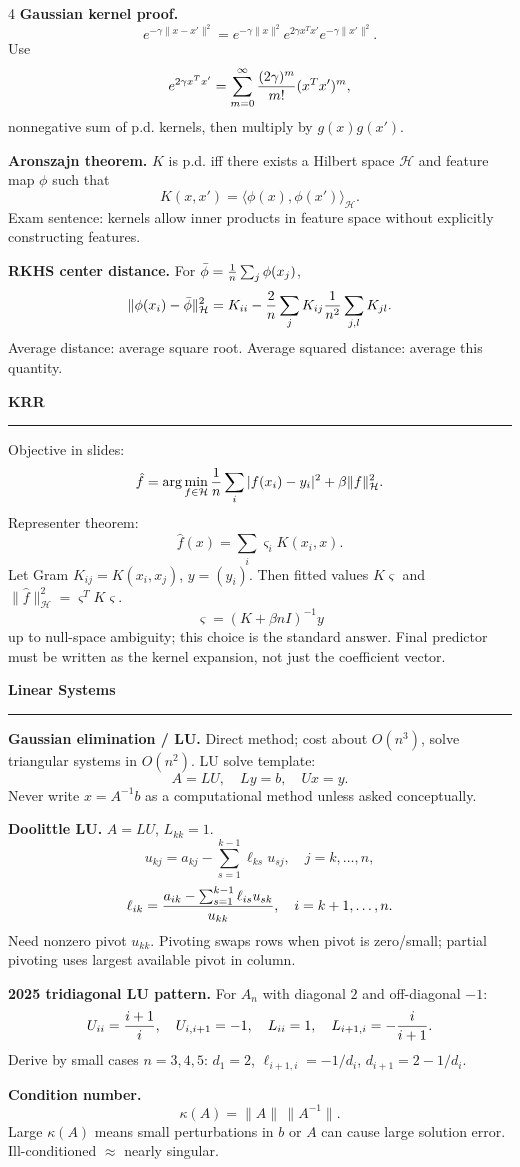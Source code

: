 \documentclass[10pt,a4paper,landscape]{article}
\newcommand{\topic}[1]{\vspace{2pt}\textbf{\large #1}\par\hrule\vspace{2pt}}
\newcommand{\subtopic}[1]{\textbf{#1.}}
\newcommand{\Hcal}{\mathcal H}
\begin{document}
\begin{multicols*}{4}
\subtopic{Gaussian kernel proof}
\[
e^{-\gamma\|x-x'\|^2}
=e^{-\gamma\|x\|^2}e^{2\gamma x^Tx'}e^{-\gamma\|x'\|^2}.
\]
Use
\[
e^{2\gamma x^Tx'}=\sum_{m=0}^{\infty}{(2\gamma)^m\over m!}(x^Tx')^m,
\]
nonnegative sum of p.d. kernels, then multiply by $g(x)g(x')$.

\subtopic{Aronszajn theorem}
$K$ is p.d. iff there exists a Hilbert space $\Hcal$ and feature map $\phi$ such that
\[
K(x,x')=\langle \phi(x),\phi(x')\rangle_{\Hcal}.
\]
Exam sentence: kernels allow inner products in feature space without explicitly constructing features.

\subtopic{RKHS center distance}
For $\bar\phi={1\over n}\sum_j\phi(x_j)$,
\[
\|\phi(x_i)-\bar\phi\|_{\Hcal}^2
=K_{ii}-{2\over n}\sum_jK_{ij}
{1\over n^2}\sum_{j,l}K_{jl}.
\]
Average distance: average square root. Average squared distance: average this quantity.

\topic{KRR}
Objective in slides:
\[
\hat f=\arg\min_{f\in\Hcal}{1\over n}\sum_i |f(x_i)-y_i|^2+\beta\|f\|_{\Hcal}^2.
\]
Representer theorem:
\[
\hat f(x)=\sum_i \varsigma_iK(x_i,x).
\]
Let Gram $K_{ij}=K(x_i,x_j)$, $y=(y_i)$. Then fitted values $K\varsigma$ and $\|\hat f\|_{\Hcal}^2=\varsigma^TK\varsigma$.
\[
\varsigma=(K+\beta n I)^{-1}y
\]
up to null-space ambiguity; this choice is the standard answer. Final predictor must be written as the kernel expansion, not just the coefficient vector.

\topic{Linear Systems}
\subtopic{Gaussian elimination / LU}
Direct method; cost about $O(n^3)$, solve triangular systems in $O(n^2)$.
LU solve template:
\[
A=LU,\quad Ly=b,\quad Ux=y.
\]
Never write $x=A^{-1}b$ as a computational method unless asked conceptually.

\subtopic{Doolittle LU}
$A=LU$, $L_{kk}=1$.
\[
u_{kj}=a_{kj}-\sum_{s=1}^{k-1}\ell_{ks}u_{sj},\quad j=k,\ldots,n,
\]
\[
\ell_{ik}={a_{ik}-\sum_{s=1}^{k-1}\ell_{is}u_{sk}\over u_{kk}},\quad i=k+1,\ldots,n.
\]
Need nonzero pivot $u_{kk}$. Pivoting swaps rows when pivot is zero/small; partial pivoting uses largest available pivot in column.

\subtopic{2025 tridiagonal LU pattern}
For $A_n$ with diagonal $2$ and off-diagonal $-1$:
\[
U_{ii}={i+1\over i},\quad U_{i,i+1}=-1,\quad
L_{ii}=1,\quad L_{i+1,i}=-{i\over i+1}.
\]
Derive by small cases $n=3,4,5$:
$d_1=2$, $\ell_{i+1,i}=-1/d_i$, $d_{i+1}=2-1/d_i$.

\subtopic{Condition number}
\[
\kappa(A)=\|A\|\,\|A^{-1}\|.
\]
Large $\kappa(A)$ means small perturbations in $b$ or $A$ can cause large solution error. Ill-conditioned $\approx$ nearly singular.


\end{multicols*}
\end{document}
